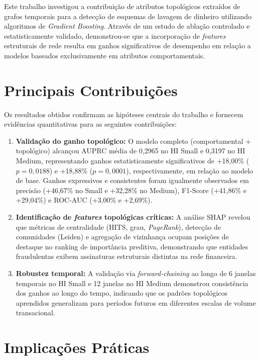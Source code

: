 \documentclass[a4paper,12pt,oneside,onecolumn,final,fleqn]{repUERJ}
\begin{document}
Este trabalho investigou a contribuição de atributos topológicos extraídos de grafos temporais para a detecção de esquemas de lavagem de dinheiro utilizando algoritmos de \textit{Gradient Boosting}. Através de um estudo de ablação controlado e estatisticamente validado, demonstrou-se que a incorporação de \textit{features} estruturais de rede resulta em ganhos significativos de desempenho em relação a modelos baseados exclusivamente em atributos comportamentais.

\section{Principais Contribuições}

Os resultados obtidos confirmam as hipóteses centrais do trabalho e fornecem evidências quantitativas para as seguintes contribuições:

\begin{enumerate}
    \item \textbf{Validação do ganho topológico:} O modelo completo (comportamental + topológico) alcançou AUPRC média de 0,2965 no HI Small e 0,3197 no HI Medium, representando ganhos estatisticamente significativos de +18,00\% ($p = 0{,}0188$) e +18,88\% ($p = 0{,}0001$), respectivamente, em relação ao modelo de base. Ganhos expressivos e consistentes foram igualmente observados em precisão (+46,67\% no Small e +32,28\% no Medium), F1-Score (+41,86\% e +29,04\%) e ROC-AUC (+3,00\% e +2,69\%).
    
    \item \textbf{Identificação de \textit{features} topológicas críticas:} A análise SHAP revelou que métricas de centralidade (HITS, grau, \textit{PageRank}), detecção de comunidades (Leiden) e agregação de vizinhança ocupam posições de destaque no ranking de importância preditiva, demonstrando que entidades fraudulentas exibem assinaturas estruturais distintas na rede financeira.
    
    \item \textbf{Robustez temporal:} A validação via \textit{forward-chaining} ao longo de 6 janelas temporais no HI Small e 12 janelas no HI Medium demonstrou consistência dos ganhos ao longo do tempo, indicando que os padrões topológicos aprendidos generalizam para períodos futuros em diferentes escalas de volume transacional.
\end{enumerate}

\section{Implicações Práticas}
\end{document}
